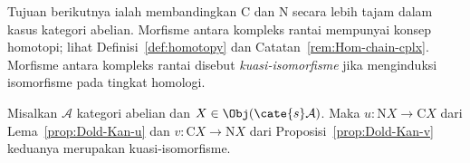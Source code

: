 Tujuan berikutnya ialah membandingkan $\mathrm{C}$ dan $\mathrm{N}$ secara
lebih tajam dalam kasus kategori abelian. Morfisme antara kompleks rantai
mempunyai konsep homotopi; lihat Definisi~\ref{def:homotopy} dan
Catatan~\ref{rem:Hom-chain-cplx}. Morfisme antara kompleks rantai disebut
\emph{kuasi-isomorfisme} jika menginduksi isomorfisme pada tingkat homologi.

\begin{theorem}\label{prop:Dold-Kan-N-C}
	Misalkan $\mathcal{A}$ kategori abelian dan
	$X\in\Obj(\cate{s}\mathcal{A})$. Maka
	$u:\mathrm{N}X\to\mathrm{C}X$ dari Lema~\ref{prop:Dold-Kan-u} dan
	$v:\mathrm{C}X\to\mathrm{N}X$ dari Proposisi~\ref{prop:Dold-Kan-v}
	keduanya merupakan kuasi-isomorfisme.
\end{theorem}
